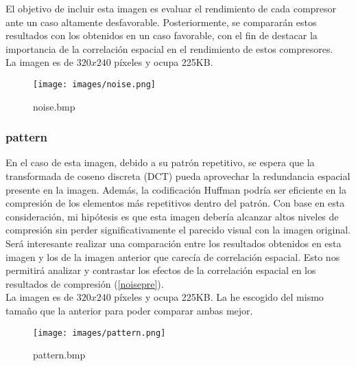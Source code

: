 \documentclass[12pt,a4paper]{article}
\begin{document}
El objetivo de incluir esta imagen es evaluar el rendimiento de cada compresor ante un caso altamente desfavorable. Posteriormente, se compararán estos resultados con los obtenidos en un caso favorable, con el fin de destacar la importancia de la correlación espacial en el rendimiento de estos compresores.\\

La imagen es de $320x240$ píxeles y ocupa 225KB.\\

\begin{figure}[H]
    \centering
    \texttt{[image: images/noise.png]}
    \caption{noise.bmp}
    
\end{figure}


\subsubsection{pattern}
En el caso de esta imagen, debido a su patrón repetitivo, se espera que la transformada de coseno discreta (DCT) pueda aprovechar la redundancia espacial presente en la imagen. Además, la codificación Huffman podría ser eficiente en la compresión de los elementos más repetitivos dentro del patrón. Con base en esta consideración, mi hipótesis es que esta imagen debería alcanzar altos niveles de compresión sin perder significativamente el parecido visual con la imagen original.\\

Será interesante realizar una comparación entre los resultados obtenidos en esta imagen y los de la imagen anterior que carecía de correlación espacial. Esto nos permitirá analizar y contrastar los efectos de la correlación espacial en los resultados de compresión (\ref{noisepre}).\\

La imagen es de $320x240$ píxeles y ocupa 225KB. La he escogido del mismo tamaño que la anterior para poder comparar ambas mejor.\\

\begin{figure}[H]
    \centering
    \texttt{[image: images/pattern.png]}
    \caption{pattern.bmp}
    
\end{figure}
\end{document}
